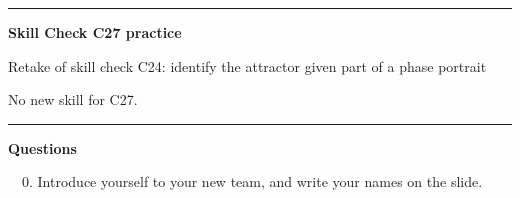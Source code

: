 \documentclass[12pt,letterpaper,noanswers]{exam}
\begin{document}
\vspace{0.2cm}
\hrule
\vspace{0.2cm}

\noindent\textbf{Skill Check C27 practice}
\begin{questions}
\item Retake of skill check C24: identify the attractor given part of a phase portrait

\item No new skill for C27.

\end{questions}

\vspace{0.2cm}

\hrule
\vspace{0.2cm}


\noindent\textbf{Questions}

\noindent \ \ 0.  Introduce yourself to your new team, and write your names on the slide.
\end{document}
